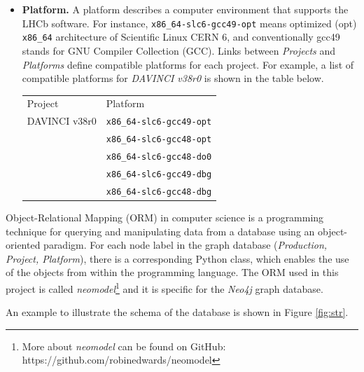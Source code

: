 \begin{itemize}
\begin{verbatim}
MATCH   p = (a:Application{project:’DAVINCI’})-
            [r:REQUIRES*..]->
            (d:Framework{project:’GAUDI’})
            RETURN p LIMIT 1
\end{verbatim}

An example of the output of the previous query is:

\begin{lstlisting}[
  mathescape,
  columns=fullflexible,
  basicstyle=\fontfamily{lmvtt}\selectfont,
]
DAVINCI v33r1 $\to$ ANALYSIS v10r3 $\to$ PHYS v16r3 $\to$ REC v14r3 
$\to$ LHCB v35r3 $\to$ GAUDI v23r5
\end{lstlisting}
    
    \item {\bf{Platform.}}
    A platform describes a computer environment that supports the LHCb software. For instance, \verb|x86_64-slc6-gcc49-opt| means optimized (opt) \verb|x86_64| architecture of Scientific Linux CERN 6, and conventionally gcc49 stands for GNU Compiler Collection (GCC). Links between \emph{Projects} and \emph{Platforms} define compatible platforms for each project. For example, a list of compatible platforms for \emph{DAVINCI v38r0} is shown in the table below.
    
    \begin{center}
    \begin{tabular}{ l l }
    Project & Platform \\
    DAVINCI v38r0 & \verb|x86_64-slc6-gcc49-opt| \\
     & \verb|x86_64-slc6-gcc48-opt| \\
     & \verb|x86_64-slc6-gcc48-do0| \\
     & \verb|x86_64-slc6-gcc49-dbg| \\
     & \verb|x86_64-slc6-gcc48-dbg| \\
    \end{tabular}
    \end{center}

\end{itemize}
\par{
Object-Relational Mapping (ORM) in computer science is a programming technique for querying and manipulating data from a database using an object-oriented paradigm. For each node label in the graph database (\emph{Production, Project, Platform}), there is a corresponding Python class, which enables the use of the objects from within the programming language. The ORM used in this project is called {\it neomodel}\footnote{More about {\it neomodel} can be found on GitHub: https://github.com/robinedwards/neomodel} and it is specific for the \emph{Neo4j} graph database.}
\par {An example to illustrate the schema of the database is shown in Figure \ref{fig:str}.}
    
